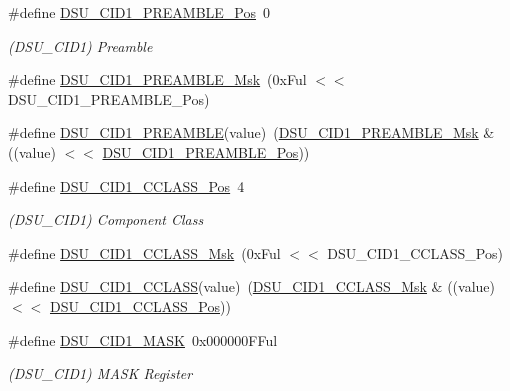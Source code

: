 \begin{DoxyCompactItemize}
\#define \mbox{\hyperlink{group___s_a_m_d21___d_s_u_ga7496e12eabba3a78eaef45bd496a9c89}{D\+S\+U\+\_\+\+C\+I\+D1\+\_\+\+P\+R\+E\+A\+M\+B\+L\+E\+\_\+\+Pos}}~0
\begin{DoxyCompactList}\small\item\em (D\+S\+U\+\_\+\+C\+I\+D1) Preamble \end{DoxyCompactList}\item 
\#define \mbox{\hyperlink{group___s_a_m_d21___d_s_u_ga10a983b3963ff405e03427c16369b0be}{D\+S\+U\+\_\+\+C\+I\+D1\+\_\+\+P\+R\+E\+A\+M\+B\+L\+E\+\_\+\+Msk}}~(0x\+Ful $<$$<$ D\+S\+U\+\_\+\+C\+I\+D1\+\_\+\+P\+R\+E\+A\+M\+B\+L\+E\+\_\+\+Pos)
\item 
\#define \mbox{\hyperlink{group___s_a_m_d21___d_s_u_gac5f44f703f59fd2e482381626a483701}{D\+S\+U\+\_\+\+C\+I\+D1\+\_\+\+P\+R\+E\+A\+M\+B\+LE}}(value)~(\mbox{\hyperlink{group___s_a_m_d21___d_s_u_ga10a983b3963ff405e03427c16369b0be}{D\+S\+U\+\_\+\+C\+I\+D1\+\_\+\+P\+R\+E\+A\+M\+B\+L\+E\+\_\+\+Msk}} \& ((value) $<$$<$ \mbox{\hyperlink{group___s_a_m_d21___d_s_u_ga7496e12eabba3a78eaef45bd496a9c89}{D\+S\+U\+\_\+\+C\+I\+D1\+\_\+\+P\+R\+E\+A\+M\+B\+L\+E\+\_\+\+Pos}}))
\item 
\#define \mbox{\hyperlink{group___s_a_m_d21___d_s_u_gaa505d5dbcb38fd84adf608eaaa7948a6}{D\+S\+U\+\_\+\+C\+I\+D1\+\_\+\+C\+C\+L\+A\+S\+S\+\_\+\+Pos}}~4
\begin{DoxyCompactList}\small\item\em (D\+S\+U\+\_\+\+C\+I\+D1) Component Class \end{DoxyCompactList}\item 
\#define \mbox{\hyperlink{group___s_a_m_d21___d_s_u_ga4266168966ac857f7f418fa53692dc42}{D\+S\+U\+\_\+\+C\+I\+D1\+\_\+\+C\+C\+L\+A\+S\+S\+\_\+\+Msk}}~(0x\+Ful $<$$<$ D\+S\+U\+\_\+\+C\+I\+D1\+\_\+\+C\+C\+L\+A\+S\+S\+\_\+\+Pos)
\item 
\#define \mbox{\hyperlink{group___s_a_m_d21___d_s_u_gab1b3d33d5908526ca1032a0ac8d792a1}{D\+S\+U\+\_\+\+C\+I\+D1\+\_\+\+C\+C\+L\+A\+SS}}(value)~(\mbox{\hyperlink{group___s_a_m_d21___d_s_u_ga4266168966ac857f7f418fa53692dc42}{D\+S\+U\+\_\+\+C\+I\+D1\+\_\+\+C\+C\+L\+A\+S\+S\+\_\+\+Msk}} \& ((value) $<$$<$ \mbox{\hyperlink{group___s_a_m_d21___d_s_u_gaa505d5dbcb38fd84adf608eaaa7948a6}{D\+S\+U\+\_\+\+C\+I\+D1\+\_\+\+C\+C\+L\+A\+S\+S\+\_\+\+Pos}}))
\item 
\#define \mbox{\hyperlink{group___s_a_m_d21___d_s_u_gab3c48e6716c2288f0cbecf4a4991dcff}{D\+S\+U\+\_\+\+C\+I\+D1\+\_\+\+M\+A\+SK}}~0x000000\+F\+Ful
\begin{DoxyCompactList}\small\item\em (D\+S\+U\+\_\+\+C\+I\+D1) M\+A\+SK Register \end{DoxyCompactList}\item 

\end{DoxyCompactItemize}
